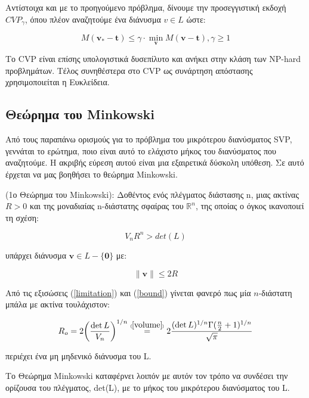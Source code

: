 Αντίστοιχα και με το προηγούμενο πρόβλημα, δίνουμε την προσεγγιστική εκδοχή $ CVP_{\gamma} $, όπου πλέον αναζητούμε ένα διάνυσμα $ v \in L $ ώστε: 

$$ Μ(\bm v_*-\bm t) \leq \gamma \cdot \min_{\bm v} M(\bm v- \bm t),  \gamma \geq 1$$ 

Το CVP είναι επίσης υπολογιστικά δυσεπίλυτο και ανήκει στην κλάση των NP-hard προβλημάτων. Τέλος συνηθέστερα στο CVP ως συνάρτηση απόστασης χρησιμοποιείται η Ευκλείδεια.  

\subsection{Θεώρημα του \lt Minkowski}

Από τους παραπάνω ορισμούς για το πρόβλημα του μικρότερου διανύσματος \lt SVP, γεννάται το ερώτημα, ποιο είναι αυτό το ελάχιστο μήκος του διανύσματος που αναζητούμε.
Η ακριβής εύρεση αυτού είναι μια εξαιρετικά δύσκολη υπόθεση. Σε αυτό έρχεται να μας βοηθήσει το θεώρημα Minkowski. 

\begin{theorem} (1ο Θεώρημα του Minkowski): Δοθέντος ενός πλέγματος διάστασης n, μιας ακτίνας $ R>0 $ και της μοναδιαίας n-διάστατης σφαίρας του $ \mathbb{R}^n $, της οποίας ο όγκος ικανοποιεί τη σχέση:

\begin{equation} \label{limitation}
    V_nR^n > det(L)
\end{equation}

υπάρχει διάνυσμα $\bm v \in L-\{\bm 0\} $ με: 

\begin{equation} \label{bound}
    \| \bm v \| \leq 2R
\end{equation}

\end{theorem}

Από τις εξισώσεις (\ref{limitation}) και (\ref{bound}) γίνεται φανερό πως μία $n$-διάστατη μπάλα με ακτίνα τουλάχιστον:

\begin{equation}
    R_o = 2 \bigg( \dfrac{\det{L}}{V_n} \bigg) ^{1/n} \stackrel{\scriptscriptstyle(\mkern-1.5mu\ref{volume}\mkern-1.5mu)}{=} 2 \dfrac{(\det{L})^{1/n} \Gamma(\frac{n}{2} + 1)^{1/n} }{\sqrt{\pi}} 
\end{equation}

περιέχει ένα μη μηδενικό διάνυσμα του L.

Το Θεώρημα Minkowski καταφέρνει λοιπόν με αυτόν τον τρόπο να συνδέσει την ορίζουσα του πλέγματος, det(L), με το μήκος του μικρότερου διανύσματος του L. 

